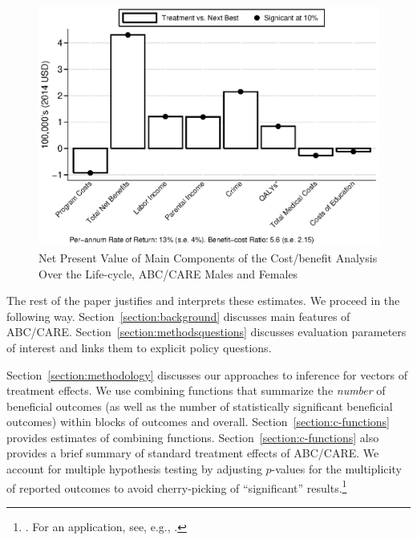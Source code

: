 \begin{figure}
\caption{Net Present Value of Main Components of the Cost/benefit Analysis Over the Life-cycle, ABC/CARE Males and Females}
\label{figure:npvsall}
\centering
\includegraphics[width=.7\columnwidth]{output/abccare_npvssumm.eps}
\end{figure}

The rest of the paper justifies and interprets these estimates. We proceed in the following way. Section~\ref{section:background} discusses main features of ABC/CARE. Section~\ref{section:methodsquestions} discusses evaluation parameters of interest and links them to explicit policy questions.

Section~\ref{section:methodology} discusses our approaches to inference for vectors of treatment effects. We use  combining functions that summarize the \emph{number} of beneficial outcomes (as well as the number of statistically significant beneficial outcomes) within blocks of outcomes and overall. Section~\ref{section:c-functions} provides estimates of combining functions. Section~\ref{section:c-functions} also provides a brief summary of standard treatment effects of ABC/CARE. We account for multiple hypothesis testing by adjusting $p$-values for the multiplicity of reported outcomes to avoid cherry-picking of ``significant'' results.\footnote{\cite{Romano_Wolf_2005_JASA}. For an application, see, e.g., \cite{Heckman_Moon_etal_2010_QE}.}

